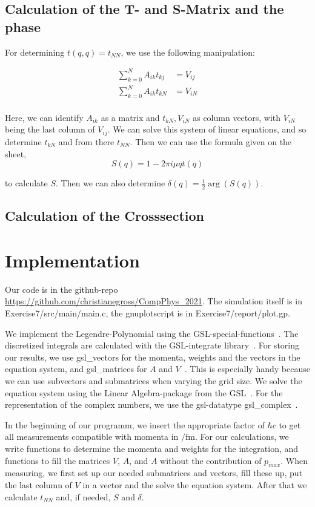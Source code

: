 \documentclass{scrartcl}
\begin{document}
\subsection{Calculation of the T- and S-Matrix and the phase}
	
	For determining $t(q, q)=t_{NN}$, we use the following manipulation:

\begin{align*}
\sum_{k=0}^{N}A_{ik}t_{kj}&=V_{ij}\\
\sum_{k=0}^{N}A_{ik}t_{kN}&=V_{iN}\\
\end{align*}

Here, we can identify $A_{ik}$ as a matrix and $t_{kN}, V_{iN}$ as column vectors, with $V_{iN}$ being the last column of $V_{ij}$. We can solve this system of linear equations, and so determine $t_{kN}$ and from there $t_{NN}$. Then we can use the formula given on the sheet,\[
S(q)=1-2\pi i \mu q t(q)
\]

to calculate $S$. Then we can also determine $\delta(q)=\frac{1}{2}\arg(S(q))$.
	
\subsection{Calculation of the Crosssection}
	
\section{Implementation}

Our code is in the github-repo \url{https://github.com/christianegross/CompPhys\_2021}. The simulation itself is in Exercise7/src/main/main.c, the gnuplotscript is in Exercise7/report/plot.gp. 

We implement the Legendre-Polynomial using the GSL-special-functions~\cite{gsldoc_sf}. The discretized integrals are calculated with the GSL-integrate library~\cite{gsldoc_integrate}. For storing our results, we use gsl\_vectors for the momenta, weights and the vectors in the equation system, and gsl\_matrices for $A$ and $V$~\cite{gsldoc_mat}. This is especially handy because we can use subvectors and submatrices when varying the grid size. We solve the equation system using the Linear Algebra-package from the GSL~\cite{gsldoc_linalg}. For the representation of the complex numbers, we use the gsl-datatype gsl\_complex~\cite{gsldoc_complex}.

In the beginning of our programm, we insert the appropriate factor of $\hbar c$ to get all measurements compatible with momenta in $\si{\per\femto\meter}$.
For our calculations, we write functions to determine the momenta and weights for the integration, and functions to fill the matrices $V$, $A$, and $A$ without the contribution of $p_{max}$. When measuring, we first set up our needed submatrices and vectors, fill these up, put the last column of $V$ in a vector and the solve the equation system. After that we calculate $t_{NN}$ and, if needed, $S$ and $\delta$.
\end{document}
